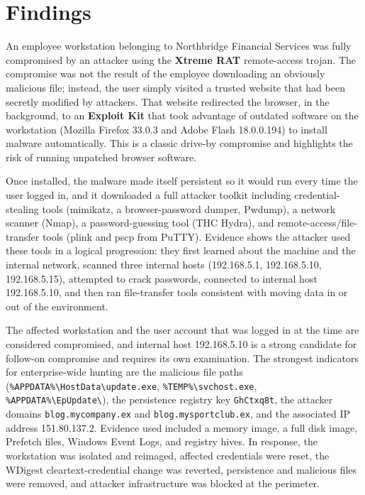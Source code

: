 \documentclass[12pt]{article}
\begin{document}
\section{Findings}

An employee workstation belonging to Northbridge Financial Services was fully compromised by an attacker using the \textbf{Xtreme RAT} remote-access trojan. The compromise was not the result of the employee downloading an obviously malicious file; instead, the user simply visited a trusted website that had been secretly modified by attackers. That website redirected the browser, in the background, to an \textbf{Exploit Kit} that took advantage of outdated software on the workstation (Mozilla Firefox 33.0.3 and Adobe Flash 18.0.0.194) to install malware automatically. This is a classic drive-by compromise and highlights the risk of running unpatched browser software.

Once installed, the malware made itself persistent so it would run every time the user logged in, and it downloaded a full attacker toolkit including credential-stealing tools (mimikatz, a browser-password dumper, Pwdump), a network scanner (Nmap), a password-guessing tool (THC Hydra), and remote-access/file-transfer tools (plink and pscp from PuTTY). Evidence shows the attacker used these tools in a logical progression: they first learned about the machine and the internal network, scanned three internal hosts (192.168.5.1, 192.168.5.10, 192.168.5.15), attempted to crack passwords, connected to internal host 192.168.5.10, and then ran file-transfer tools consistent with moving data in or out of the environment.

The affected workstation and the user account that was logged in at the time are considered compromised, and internal host 192.168.5.10 is a strong candidate for follow-on compromise and requires its own examination. The strongest indicators for enterprise-wide hunting are the malicious file paths (\texttt{\%APPDATA\%\textbackslash HostData\textbackslash update.exe}, \texttt{\%TEMP\%\textbackslash svchost.exe}, \texttt{\%APPDATA\%\textbackslash EpUpdate\textbackslash}), the persistence registry key \texttt{GhCtxq8t}, the attacker domains \texttt{blog.mycompany.ex} and \texttt{blog.mysportclub.ex}, and the associated IP address 151.80.137.2. Evidence used included a memory image, a full disk image, Prefetch files, Windows Event Logs, and registry hives. In response, the workstation was isolated and reimaged, affected credentials were reset, the WDigest cleartext-credential change was reverted, persistence and malicious files were removed, and attacker infrastructure was blocked at the perimeter.
\end{document}
